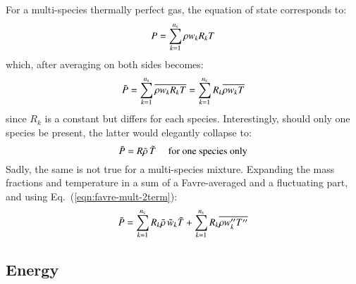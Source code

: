 \documentclass{warpdoc}
\newcommand{\ns}{{{n}_{\rm s}}}
\begin{document}
For a multi-species thermally perfect gas, the equation of state corresponds
to:
%
\begin{equation}
  P = \sum_{k=1}^\ns  \rho  w_k  R_k  T
\end{equation}
%
which, after averaging on both sides becomes:
%
\begin{equation}
 \wbar{P} = \sum_{k=1}^\ns \overline{\rho  w_k R_k  T}
              = \sum_{k=1}^\ns R_k \overline{\rho  w_k T}
\end{equation}
%
since $R_k$ is a constant but differs for each species. Interestingly,
should only one species be present, the latter would elegantly collapse
to:
%
\begin{equation}
 \bar{P} = R \bar{\rho}\,  \tilde{T} \textrm{~~~~~for one species only}
\end{equation}
%
Sadly, the same is not true for a multi-species mixture. Expanding the
mass fractions and temperature in a sum of a Favre-averaged and a fluctuating
part, and using Eq.\ (\ref{eqn:favre-mult-2term}):
%
\begin{equation}
 \wbar{P}
     =   \sum_{k=1}^\ns R_k \wbar{\rho}\,  {\wtilde{w}_k} \wtilde{T}
       + \sum_{k=1}^\ns R_k \overline{\rho w_k^{\prime\prime} T^{\prime\prime}}
 \label{eqn:EOS:final}
\end{equation}
%





\subsection{Energy}
\end{document}
